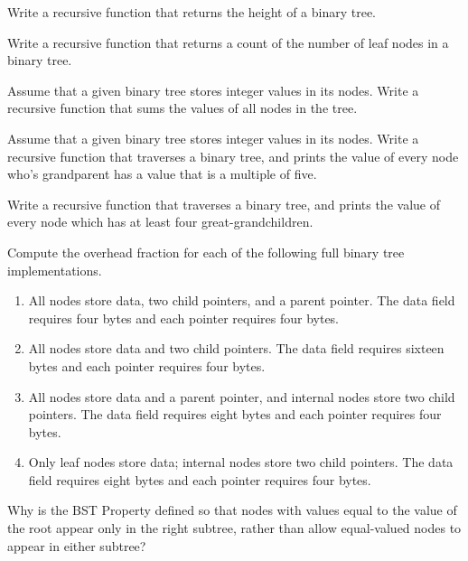 \begin{exercises}
\item
Write a recursive function that returns the height of a binary tree.

\item
Write a recursive function that returns a count of the number of leaf
nodes in a binary tree.

\item
Assume that a given binary tree stores integer values in its nodes.
Write a recursive function that sums the values of all nodes in the tree.

\item
Assume that a given binary tree stores integer values in its nodes.
Write a recursive function that traverses a binary tree, and prints
the value of every node who's grandparent has a value that is a
multiple of five.

\item
Write a recursive function that traverses a binary tree, and prints
the value of every node which has at least four great-grandchildren.

\item
Compute the overhead fraction for each of the following full binary
tree implementations.

\begin{enumerate}

\item
All nodes store data, two child pointers, and a parent pointer.
The data field requires four bytes and each pointer requires four
bytes.

\item
All nodes store data and two child pointers.
The data field requires sixteen bytes and each pointer requires four
bytes.

\item
All nodes store data and a parent pointer, and internal nodes store
two child pointers.
The data field requires eight bytes and each pointer requires four
bytes.

\item
Only leaf nodes store data; internal nodes store two child
pointers.
The data field requires eight bytes and each pointer requires four
bytes.
\end{enumerate}

\item
Why is the BST Property defined so that nodes with
values equal to the value of the root appear only in the right
subtree, rather than allow equal-valued nodes to appear in either
subtree?


\end{exercises}
